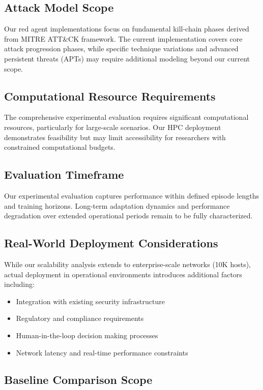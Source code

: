 \documentclass[12pt,oneside]{article}
\begin{document}
\subsection{Attack Model Scope}

Our red agent implementations focus on fundamental kill-chain phases derived from MITRE ATT\&CK framework. The current implementation covers core attack progression phases, while specific technique variations and advanced persistent threats (APTs) may require additional modeling beyond our current scope.

\subsection{Computational Resource Requirements}

The comprehensive experimental evaluation requires significant computational resources, particularly for large-scale scenarios. Our HPC deployment demonstrates feasibility but may limit accessibility for researchers with constrained computational budgets.

\subsection{Evaluation Timeframe}

Our experimental evaluation captures performance within defined episode lengths and training horizons. Long-term adaptation dynamics and performance degradation over extended operational periods remain to be fully characterized.

\subsection{Real-World Deployment Considerations}

While our scalability analysis extends to enterprise-scale networks (10K hosts), actual deployment in operational environments introduces additional factors including:
\begin{itemize}
\item Integration with existing security infrastructure
\item Regulatory and compliance requirements
\item Human-in-the-loop decision making processes
\item Network latency and real-time performance constraints
\end{itemize}

\subsection{Baseline Comparison Scope}
\end{document}
